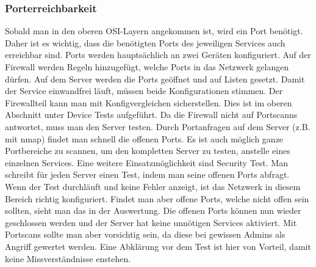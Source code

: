 \documentclass[a4,12pt]{scrartcl}
\begin{document}
\subsubsection{Porterreichbarkeit}
Sobald man in den oberen OSI-Layern angekommen ist, wird ein Port benötigt. Daher ist es wichtig, dass die benötigten Ports des jeweiligen Services auch erreichbar sind.\newline\newline
Ports werden hauptsächlich an zwei Geräten konfiguriert. Auf der Firewall werden Regeln hinzugefügt, welche Ports in das Netzwerk gelangen dürfen. Auf dem Server werden die Ports geöffnet und auf Listen gesetzt. Damit der Service einwandfrei läuft, müssen beide Konfigurationen stimmen. Der Firewallteil kann man mit Konfigvergleichen sicherstellen. Dies ist im oberen Abschnitt unter Device Tests aufgeführt.\newline\newline
Da die Firewall nicht auf Portscanns antwortet, muss man den Server testen. Durch Portanfragen auf dem Server (z.B. mit nmap) findet man schnell die offenen Ports. Es ist auch möglich ganze Portbereiche zu scannen, um den kompletten Server zu testen, anstelle eines einzelnen Services.\newline\newline
Eine weitere Einsatzmöglichkeit sind Security Test. Man schreibt für jeden Server einen Test, indem man seine offenen Ports abfragt. Wenn der Test durchläuft und keine Fehler anzeigt, ist das Netzwerk in diesem Bereich richtig konfiguriert. Findet man aber offene Ports, welche nicht offen sein sollten, sieht man das in der Auswertung. Die offenen Ports können nun wieder geschlossen werden und der Server hat keine unnötigen Services aktiviert.\newline\newline
Mit Portscans sollte man aber vorsichtig sein, da diese bei gewissen Admins als Angriff gewertet werden. Eine Abklärung vor dem Test ist hier von Vorteil, damit keine Missverständnisse enstehen.
\end{document}
